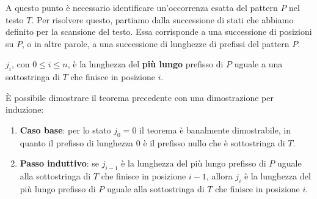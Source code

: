 A questo punto è necessario identificare un'occorrenza esatta del pattern $P$ nel testo $T$. Per risolvere questo, partiamo dalla successione di stati che abbiamo definito per la scansione del testo. Essa corrisponde a una successione di posizioni su $P$, o in altre parole, a una successione di lunghezze di prefissi del pattern $P$.
\begin{teorema}
    $j_i$, con $0 \leq i \leq n$, è la lunghezza del \textbf{più lungo} prefisso di $P$ uguale a una sottostringa di $T$ che finisce in posizione $i$.
\end{teorema}
\begin{dimostrazione}
    È possibile dimostrare il teorema precedente con una dimostrazione per induzione:
    \begin{enumerate}
        \item \textbf{Caso base}: per lo stato $j_0 = 0$ il teorema è banalmente dimostrabile, in quanto il prefisso di lunghezza $0$ è il prefisso nullo che è sottostringa di $T$.
        \item \textbf{Passo induttivo}: se $j_{i-1}$ è la lunghezza del più lungo prefisso di $P$ uguale alla sottostringa di $T$ che finisce in posizione $i-1$, allora $j_i$ è la lunghezza del più lungo prefisso di $P$ uguale alla sottostringa di $T$ che finisce in posizione $i$.


\end{enumerate}
\end{dimostrazione}
